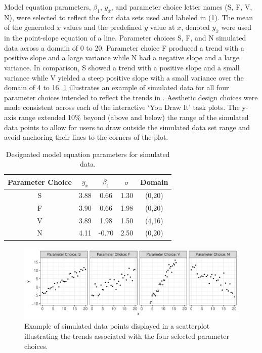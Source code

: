 \documentclass[12pt]{article}
\begin{document}
Model equation parameters, \(\beta_1\), \(y_{\bar{x}}\), and parameter
choice letter names (S, F, V, N), were selected to reflect the four data
sets used and labeled in \citet{mosteller1981eye}
(\cref{tab:eyefitting-parameters}). The mean of the generated \(x\)
values and the predefined \(y\) value at \(\bar x\), denoted
\(y_{\bar x}\) were used in the point-slope equation of a line.
Parameter choices S, F, and N simulated data across a domain of 0 to 20.
Parameter choice F produced a trend with a positive slope and a large
variance while N had a negative slope and a large variance. In
comparison, S showed a trend with a positive slope and a small variance
while V yielded a steep positive slope with a small variance over the
domain of 4 to 16. \cref{fig:eyefitting-simplot} illustrates an example
of simulated data for all four parameter choices intended to reflect the
trends in \citet{mosteller1981eye}. Aesthetic design choices were made
consistent across each of the interactive `You Draw It' task plots. The
y-axis range extended 10\% beyond (above and below) the range of the
simulated data points to allow for users to draw outside the simulated
data set range and avoid anchoring their lines to the corners of the
plot.

\begin{table}

\caption{\label{tab:eyefitting-parameters}Designated model equation parameters for simulated data.}
\centering
\begin{tabular}[t]{ccccc}
\toprule
Parameter Choice & $y_{\bar{x}}$ & $\beta_1$ & $\sigma$ & Domain\\
\midrule
S & 3.88 & 0.66 & 1.30 & (0,20)\\
F & 3.90 & 0.66 & 1.98 & (0,20)\\
V & 3.89 & 1.98 & 1.50 & (4,16)\\
N & 4.11 & -0.70 & 2.50 & (0,20)\\
\bottomrule
\end{tabular}
\end{table}

\begin{figure}[tbp]

{\centering \includegraphics[width=1\linewidth,]{Eye-Fitting-Straight-Lines-in-the-Modern-Era_files/figure-latex/eyefitting-simplot-1} 

}

\caption{Example of simulated data points displayed in a scatterplot illustrating the trends associated with the four selected parameter choices.}\label{fig:eyefitting-simplot}
\end{figure}
\end{document}
